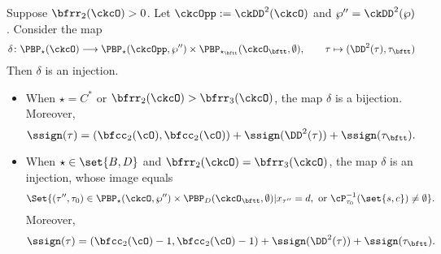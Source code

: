 \documentclass[unipcounting]{subfiles}
\begin{document}
\begin{prop}\label{prop:delta}
Suppose $\bfrr_2(\ckcO)>0$. Let $\ckcOpp := \ckDD^2(\ckcO)$ and  $\wp'' = \ckDD^2(\wp)$. Consider the map 
\begin{equation}\label{eq:delta}
    \delta \colon \PBP_\star(\ckcO)\longrightarrow 
    \PBP_\star(\ckcOpp,\wp'')\times \PBP_{\star_\bftt}(\ckcO_\bftt,\emptyset),
    \qquad \tau \mapsto (\DD^2(\tau),\tau_\bftt)
\end{equation}
Then $\delta$ is an injection. 
\begin{itemize}
\item
    When $\star = C^*$ or $\bfrr_2(\ckcO)>\bfrr_3(\ckcO)$, the map $\delta$ is a bijection. 
    Moreover,
\[
\ssign(\tau)
=(\bfcc_2(\cO),\bfcc_2(\cO))+\ssign(\DD^2(\tau))+\ssign(\tau_\bftt).
\]
\item
    When  $\star \in \set{B,D}$ and $\bfrr_2(\ckcO)=\bfrr_3(\ckcO)$, the map $\delta$ is an injection,
    whose image equals 
    \[
    \Set{ (\tau'',\tau_0)  \in \PBP_\star(\ckcO,\wp'')\times \PBP_D(\ckcO_\bftt,\emptyset)  | 
    x_{\tau''} = d, \text{ or } 
    \cP_{\tau_0}^{-1}(\set{s,c})\neq \emptyset }.
    \]
    Moreover,
\[
\ssign(\tau)
=(\bfcc_2(\cO)-1,\bfcc_2(\cO)-1)+\ssign(\DD^2(\tau))+\ssign(\tau_\bftt).
\]
\end{itemize}
\end{prop}
\end{document}
